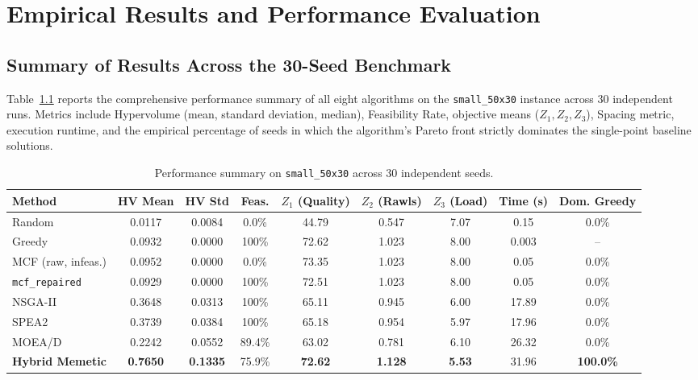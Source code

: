 \chapter{Empirical Results and Performance Evaluation}
\label{ch:results}

\section{Summary of Results Across the 30-Seed Benchmark}
Table~\ref{tab:small_benchmark_summary} reports the comprehensive performance summary of all eight algorithms on the \texttt{small\_50x30} instance across 30 independent runs. Metrics include Hypervolume (mean, standard deviation, median), Feasibility Rate, objective means ($Z_1, Z_2, Z_3$), Spacing metric, execution runtime, and the empirical percentage of seeds in which the algorithm's Pareto front strictly dominates the single-point baseline solutions.

\begin{table}[htbp]
    \centering
    \small
    \caption{Performance summary on \texttt{small\_50x30} across 30 independent seeds.}
    \label{tab:small_benchmark_summary}
    \begin{tabularx}{\textwidth}{lcccccccc}
        \toprule
        \textbf{Method} & \textbf{HV Mean} & \textbf{HV Std} & \textbf{Feas.} & \textbf{$Z_1$ (Quality)} & \textbf{$Z_2$ (Rawls)} & \textbf{$Z_3$ (Load)} & \textbf{Time (s)} & \textbf{Dom. Greedy} \\
        \midrule
        Random & 0.0117 & 0.0084 & 0.0\% & 44.79 & 0.547 & 7.07 & 0.15 & 0.0\% \\
        Greedy & 0.0932 & 0.0000 & 100\% & 72.62 & 1.023 & 8.00 & 0.003 & -- \\
        MCF (raw, infeas.) & 0.0952 & 0.0000 & 0.0\% & 73.35 & 1.023 & 8.00 & 0.05 & 0.0\% \\
        \texttt{mcf\_repaired} & 0.0929 & 0.0000 & 100\% & 72.51 & 1.023 & 8.00 & 0.05 & 0.0\% \\
        NSGA-II & 0.3648 & 0.0313 & 100\% & 65.11 & 0.945 & 6.00 & 17.89 & 0.0\% \\
        SPEA2 & 0.3739 & 0.0384 & 100\% & 65.18 & 0.954 & 5.97 & 17.96 & 0.0\% \\
        MOEA/D & 0.2242 & 0.0552 & 89.4\% & 63.02 & 0.781 & 6.10 & 26.32 & 0.0\% \\
        \textbf{Hybrid Memetic} & \textbf{0.7650} & \textbf{0.1335} & 75.9\% & \textbf{72.62} & \textbf{1.128} & \textbf{5.53} & 31.96 & \textbf{100.0\%} \\
        \bottomrule
    \end{tabularx}
\end{table}

